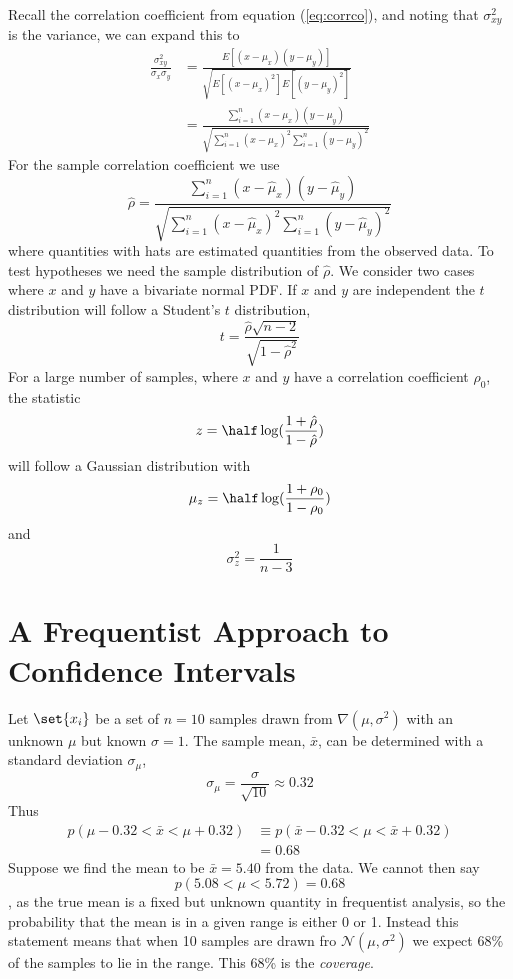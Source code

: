 \documentclass{dwnotes}         		        %
\begin{document}
Recall the correlation coefficient from equation (\ref{eq:corrco}),
and noting that $\sigma_{xy}^2$ is the variance, we can expand this to
\begin{align*}
  \frac{\sigma_{xy}^2}{\sigma_x \sigma_y} &= \frac{E[(x-\mu_x)(y-\mu_y)]}{\sqrt{E[(x-\mu_x)^2] E[(y-\mu_y)^2]}} \\
&= \frac{\sum_{i=1}^n (x-\mu_x)(y-\mu_y)}{ \sqrt{\sum_{i=1}^n (x-\mu_x)^2 \sum_{i=1}^n (y-\mu_y)^2}}
\end{align*}
For the sample correlation coefficient we use
\begin{equation}
  \label{eq:7}
  \hat{\rho} = \frac{\sum_{i=1}^n (x-\hat{\mu}_x)(y-\hat{\mu}_y)}{ \sqrt{\sum_{i=1}^n (x-\hat{\mu}_x)^2 \sum_{i=1}^n (y-\hat{\mu}_y)^2}}
\end{equation}
where quantities with hats are estimated quantities from the observed
data. To test hypotheses we need the sample distribution of
$\hat{\rho}$. We consider two cases where $x$ and $y$ have a bivariate
normal PDF. If $x$ and $y$ are independent the $t$ distribution will
follow a Student's $t$ distribution,
\[ t = \frac{\hat{\rho} \sqrt{n-2}}{\sqrt{1-\hat{\rho}^2}} \] For a
large number of samples, where $x$ and $y$ have a correlation
coefficient $\rho_0$, the statistic
\[ z= \half \log( \frac{1+\hat{\rho}}{1-\hat{\rho}}) \]
will follow a Gaussian distribution with
\[ \mu_z = \half \log( \frac{1 + \rho_0}{1 - \rho_0} ) \] 
and 
\[ \sigma_z^2 = \frac{1}{n-3} \]

\section{A Frequentist Approach to Confidence Intervals}
\label{sec:freq-appr-conf}

Let $\set{x_i}$ be a set of $n=10$ samples drawn from $\nabla(\mu,
\sigma^2)$ with an unknown $\mu$ but known $\sigma=1$. The sample
mean, $\bar{x}$, can be determined with a standard deviation
$\sigma_{\mu}$,
\[ \sigma_{\mu} = \frac{\sigma}{\sqrt{10}} \approx 0.32 \]
Thus
\begin{align*}
  p(\mu-0.32 < \bar{x} < \mu+0.32) & \equiv p(\bar{x} - 0.32 < \mu <
  \bar{x} + 0.32) \\ &= 0.68
\end{align*}
Suppose we find the mean to be $\bar{x}=5.40$ from the data. We cannot then say
\[ p(5.08 < \mu < 5.72)=0.68 \], as the true mean is a fixed but
unknown quantity in frequentist analysis, so the probability that the
mean is in a given range is either 0 or 1. Instead this statement
means that when 10 samples are drawn fro $\mathcal{N}(\mu, \sigma^2)$
we expect 68\% of the samples to lie in the range. This 68\% is the
\emph{coverage}.
\end{document}
